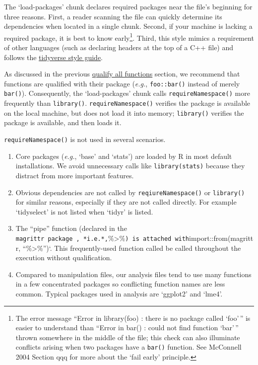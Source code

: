 \documentclass[
]{book}
\providecommand{\tightlist}{%
  \setlength{\itemsep}{0pt}\setlength{\parskip}{0pt}}
\begin{document}
The `load-packages' chunk declares required packages near the file's beginning for three reasons. First, a reader scanning the file can quickly determine its dependencies when located in a single chunk. Second, if your machine is lacking a required package, it is best to know early\footnote{The error message ``Error in library(foo) : there is no package called `foo'\,'' is easier to understand than ``Error in bar() : could not find function `bar'\,'' thrown somewhere in the middle of the file; this check can also illuminate conflicts arising when two packages have a \texttt{bar()} function. See McConnell 2004 Section qqq for more about the `fail early' principle.}. Third, this style mimics a requirement of other languages (such as declaring headers at the top of a C++ file) and follows the \href{https://style.tidyverse.org/files.html\#internal-structure}{tidyverse style guide}.

As discussed in the previous \protect\hyperlink{qualify-functions}{qualify all functions} section, we recommend that functions are qualified with their package (\emph{e.g.}, \texttt{foo::bar()} instead of merely \texttt{bar()}). Consequently, the `load-packages' chunk calls \texttt{requireNamespace()} more frequently than \texttt{library()}. \texttt{requireNamespace()} verifies the package is available on the local machine, but does not load it into memory; \texttt{library()} verifies the package is available, and then loads it.

\texttt{requireNamespace()} is not used in several scenarios.

\begin{enumerate}
\def\labelenumi{\arabic{enumi}.}
\tightlist
\item
  Core packages (\emph{e.g.}, `base' and `stats') are loaded by R in most default installations. We avoid unnecessary calls like \texttt{library(stats)} because they distract from more important features.
\item
  Obvious dependencies are not called by \texttt{reqiureNamespace()} or \texttt{library()} for similar reasons, especially if they are not called directly. For example `tidyselect' is not listed when `tidyr' is listed.
\item
  The ``pipe'' function (declared in the \texttt{magrittr\textquotesingle{}\ package\ ,\ *i.e.*,}\%\textgreater\%\texttt{)\ is\ attached\ with}import::from(magrittr, ``\%\textgreater\%'')`. This frequently-used function called be called throughout the execution without qualification.
\item
  Compared to manipulation files, our analysis files tend to use many functions in a few concentrated packages so conflicting function names are less common. Typical packages used in analysis are `ggplot2' and `lme4'.
\end{enumerate}
\end{document}
